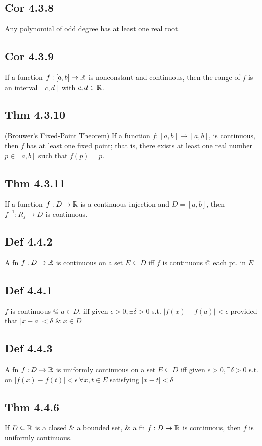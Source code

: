 \subsection*{Cor 4.3.8}
Any polynomial of odd degree has at least one real root.

\subsection*{Cor 4.3.9}
If a function $f : [a, b] \to \mathbb{R}$ is nonconstant and continuous, then the range of $f$ is an interval $[c, d]$ with $c, d \in \mathbb{R}$.

\subsection*{Thm 4.3.10}
    (Brouwer's Fixed-Point Theorem) If a function $f : [a, b] \to [a, b]$, is continuous, then $f$ has at least one fixed point; that is, there exists at least one real number $p \in [a, b]$ such that $f (p) = p$.

\subsection*{Thm 4.3.11}
    If a function $f : D \to \mathbb{R}$ is a continuous injection and $D = [a, b]$, then $f^{-1} : R_f \to D$ is continuous.

\subsection*{Def 4.4.2}
    A fn $f : D \to \mathbb{R}$ is continuous on a set $E \subseteq D$ iff $f$ is continuous @ each pt. in $E$

\subsection*{Def 4.4.1}
$f$ is continuous @ $a \in D$, iff given $\epsilon > 0, \exists \delta > 0$ s.t.  $| f(x) - f(a) | < \epsilon$ provided that $|x - a| < \delta$ \& $x \in D$

\subsection*{Def 4.4.3}
    A fn $f : D \to \mathbb{R}$ is uniformly continuous on a set $E \subseteq D$ iff given $\epsilon > 0, \exists \delta > 0$ s.t. on $| f(x) - f(t) | < \epsilon \ \forall x, t \in  E$ satisfying $|x - t| < \delta$

\subsection*{Thm 4.4.6}
If $D \subseteq \mathbb{R}$ is a closed \& a bounded set, \& a fn $f : D \to \mathbb{R}$ is continuous, then $f$ is uniformly continuous.

